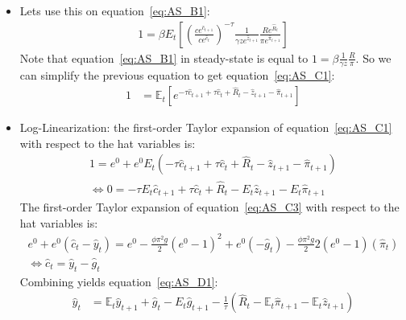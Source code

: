 \begin{enumerate}
\begin{itemize}
  \item Lets use this on equation~\eqref{eq:AS_B1}:
  \begin{align*}
  1 = \beta E_t \left[ {\left(\frac{c e^{\hat{c}_{t+1}}}{c e^{\hat{c}_t}}\right)}^{-\tau} \frac{1}{\gamma z e^{\hat{z}_{t+1}}} \frac{R e^{\hat{R}_t}}{\pi e^{\hat{\pi}_{t+1}}} \right]
  \end{align*}
  Note that equation~\eqref{eq:AS_B1} in steady-state is equal to \(1 = \beta \frac{1}{\gamma z}\frac{R}{\pi}\).
  So we can simplify the previous equation to get equation~\eqref{eq:AS_C1}:
  \begin{align*}
  1 &= \mathbb{E}_t \left[e^{-\tau \hat{c}_{t+1} + \tau \hat{c}_{t} + \hat{R}_{t} - \hat{z}_{t+1} - \hat{\pi}_{t+1} }\right]
  \end{align*}

  \item Log-Linearization: the first-order Taylor expansion of equation~\eqref{eq:AS_C1} with respect to the hat variables is:
  \begin{align*}
  1 = e^0 + e^0 E_t \left(-\tau \hat{c}_{t+1} + \tau \hat{c}_{t} + \hat{R}_{t} - \hat{z}_{t+1} - \hat{\pi}_{t+1}  \right)\\
  \Leftrightarrow
  0 = -\tau E_t \hat{c}_{t+1} + \tau \hat{c}_{t} + \hat{R}_{t} - E_t\hat{z}_{t+1} - E_t \hat{\pi}_{t+1}
  \end{align*}
  The first-order Taylor expansion of equation~\eqref{eq:AS_C3} with respect to the hat variables is:
  \begin{align*}
  e^0 + e^0\left(\hat{c}_t - \hat{y}_t\right) = e^0 - \frac{\phi \pi^2 g}{2} {(e^0-1)}^2 + e^0(-\hat{g}_t) - \frac{\phi \pi^2 g}{2} 2 \left(e^0-1\right)(\hat{\pi}_t)\\
  \Leftrightarrow \hat{c}_t = \hat{y}_t -\hat{g}_t
  \end{align*}
  Combining yields equation~\eqref{eq:AS_D1}:
  \begin{align*}
  \hat{y}_{t} &= \mathbb{E}_t \hat{y}_{t+1} + \hat{g}_{t} - E_t\hat{g}_{t+1} - \frac{1}{\tau} \left(\hat{R}_{t}- \mathbb{E}_t \hat{\pi}_{t+1} - \mathbb{E}_t \hat{z}_{t+1}\right)
  \end{align*}

\end{itemize}


\end{enumerate}
